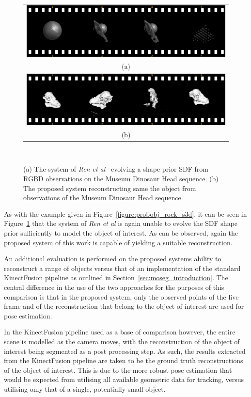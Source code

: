 \begin{figure}[!htbp]
  \centering
  \begin{tabular}{@{}c@{}}
    \includegraphics[width=.75\linewidth]{figures/object_recon/strips/dino_s3d.png} \\
    (a) \\
    \includegraphics[width=.75\linewidth]{figures/object_recon/strips/dino.png} \\ 
    (b) \\
  \end{tabular}
  \caption[Probabilistic Object Reconstruction Qualitative Results II]
  {(a) The system of \textit{Ren et al}~\cite{Ren2013} evolving a shape prior SDF 
  from RGBD observations on the Museum Dinosaur Head sequence. (b) The proposed system 
  reconstructing same the object from observations of the Museum Dinosaur Head sequence.}
~\label{figure:probobj_dino_s3d}
\end{figure}

As with the example given in Figure~\ref{figure:probobj_rock_s3d}, it can be seen in 
Figure~\ref{figure:probobj_dino_s3d} that the system of \textit{Ren et al} is again 
unable to evolve the SDF shape prior sufficiently to model the object of interest. As 
can be observed, again the proposed system of this work is capable of yielding a suitable 
reconstruction.

An additional evaluation is performed on the proposed systems ability to reconstruct 
a range of objects versus that of an implementation of the standard KinectFusion 
pipeline as outlined in Section~\ref{sec:moseg_introduction}. The central difference in 
the use of the two approaches for the purposes of this comparison is that in the proposed 
system, only the observed points of the live frame and of the reconstruction that belong to 
the object of interest are used for pose estimation. 

In the KinectFusion pipeline used as a base of comparison however, the entire scene is modelled 
as the camera moves, with the reconstruction of the object of interest being segmented as a post 
processing step. As such, the results extracted from the KinectFusion pipeline are taken to be the 
ground truth reconstructions of the object of interest. This is due to the more robust 
pose estimation that would be expected from utilising all available geometric data 
for tracking, versus utilising only that of a single, potentially small object.

